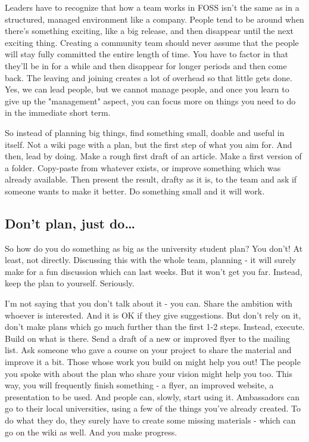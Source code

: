 Leaders have to recognize that how a team works in FOSS isn't the same as in a structured, managed environment like a company. People tend to be around when there's something exciting, like a big release, and then disappear until the next exciting thing. Creating a community team should never assume that the people will stay fully committed the entire length of time. You have to factor in that they'll be in for a while and then disappear for longer periods and then come back. The leaving and joining creates a lot of overhead so that little gets done. Yes, we can lead people, but we cannot manage people, and once you learn to give up the "management" aspect, you can focus more on things you need to do in the immediate short term.

So instead of planning big things, find something small, doable and useful in itself. Not a wiki page with a plan, but the first step of what you aim for. And then, lead by doing. Make a rough first draft of an article. Make a first version of a folder. Copy-paste from whatever exists, or improve something which was already available. Then present the result, drafty as it is, to the team and ask if someone wants to make it better. Do something small and it will work.

\subsection*{Don't plan, just do\dots}
So how do you do something as big as the university student plan? You don't! At least, not directly. Discussing this with the whole team, planning - it will surely make for a fun discussion which can last weeks. But it won't get you far. Instead, keep the plan to yourself. Seriously.

I'm not saying that you don't talk about it - you can. Share the ambition with whoever is interested. And it is OK if they give suggestions. But don't rely on it, don't make plans which go much further than the first 1-2 steps. Instead, execute. Build on what is there. Send a draft of a new or improved flyer to the mailing list. Ask someone who gave a course on your project to share the material and improve it a bit. Those whose work you build on might help you out! The people you spoke with about the plan who share your vision might help you too. This way, you will frequently finish something - a flyer, an improved website, a presentation to be used. And people can, slowly, start using it. Ambassadors can go to their local universities, using a few of the things you've already created. To do what they do, they surely have to create some missing materials - which can go on the wiki as well. And you make progress.

